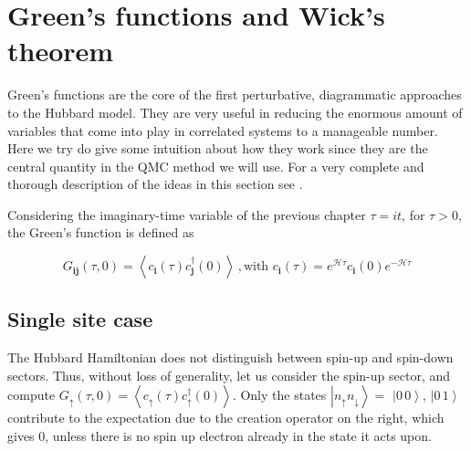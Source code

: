 \section{Green's functions and Wick's theorem}\label{sec:green}

Green's functions are the core of the first perturbative, diagrammatic approaches to the Hubbard model.
They are very useful in reducing the enormous amount of variables that come into play in correlated systems to a manageable number.
Here we try do give some intuition about how they work since they are the central quantity in the \acs{QMC} method we will use.
For a very complete and thorough description of the ideas in this section see \cite{fetter_quantum_2003}.

Considering the imaginary-time variable of the previous chapter $\tau = i t$, for $\tau > 0$, the Green's function is defined as

\begin{equation}
G_{\bm i \bm j} ( \tau, 0 ) = \left\langle c_{\bm i} ( \tau ) c_{\bm j}^\dagger ( 0 ) \right\rangle  \, , \text{with} \,\, c_{\bm i} ( \tau ) = e^{\mathcal{H} \tau } c_{\bm i} ( 0 ) e^{- \mathcal{H} \tau } 
\end{equation}

\subsection{Single site case}

The Hubbard Hamiltonian does not distinguish between spin-up and spin-down sectors.
Thus, without loss of generality, let us consider the spin-up sector, and compute $G_\uparrow (\tau, 0) =  \left\langle c_{\uparrow} ( \tau) c_{\uparrow}^\dagger ( 0 ) \right\rangle$.
Only the states $\left| n_{\uparrow} n_{\downarrow} \right\rangle = $ $\left| 0\, 0 \right\rangle$, $\left| 0\, 1 \right\rangle$ contribute to the expectation due to the creation operator on the right, which gives 0, unless there is no spin up electron already in the state it acts upon.

